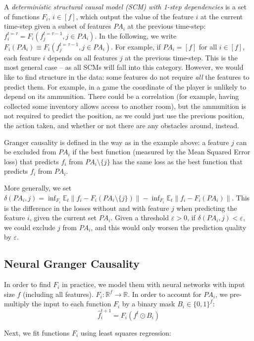 \documentclass[a4paper,11pt,oneside]{report}
\begin{document}
A {\em deterministic structural causal model (SCM) with 1-step dependencies} is a set of functions $F_i$, $i\in[f]$, which output the value of the feature $i$ at the current time-step given a subset of features $PA_i$ at the previous time-step: $f_i^{t=\tau}=F_i(f_j^{t=\tau-1},j\in PA_i)$. In the following, we write $F_i(PA_i)\equiv F_i(f_j^{t=\tau-1},j\in PA_i)$. For example, if $PA_i=[f]$ for all $i\in[f]$, each feature $i$ depends on all features $j$ at the previous time-step. This is the most general case -- as all SCMs will fall into this category. However, we would like to find structure in the data: some features do not require {\em all} the features to predict them. For example, in a game the coordinate of the player is unlikely to depend on its ammunition. There could be a correlation (for example, having collected some inventory allows access to another room), but the ammunition is not required to predict the position, as we could just use the previous position, the action taken, and whether or not there are any obstacles around, instead.

Granger causality\cite{Barnett2015} is defined in the way as in the example above: a feature $j$ can be excluded from $PA_i$ if the best function (measured by the Mean Squared Error loss) that predicts $f_i$ from $PA_i\setminus\{j\}$ has the same loss as the best function that predicts $f_i$ from $PA_i$.

More generally, we set $\delta(PA_i,j)=\inf_{F_i}\mathbb E_t\|f_i-F_i(PA_i\setminus\{j\})\|-\inf_{F_i}\mathbb E_t\|f_i-F_i(PA_i)\|$. This is the difference in the losses without and with feature $j$ when predicting the feature $i$, given the current set $PA_i$.
Given a threshold $\varepsilon>0$, if $\delta(PA_i,j)<\varepsilon$, we could exclude $j$ from $PA_i$, and this would only worsen the prediction quality by $\varepsilon$.

\subsection{Neural Granger Causality}
\label{subsec:neural_granger}
In order to find $F_i$ in practice, we model them with neural networks\cite{Tank2018} with input size $f$ (including all features). $F_i\colon \mathbb R^{f}\to\mathbb R$. In order to account for $PA_i$, we pre-multiply the input to each function $F_i$ by a binary mask $B_i\in\{0,1\}^f$:
$$
\hat{f}_i^{t+1}=F_i(f^t\odot B_i)
$$

Next, we fit functions $F_i$ using least squares regression:
\end{document}
